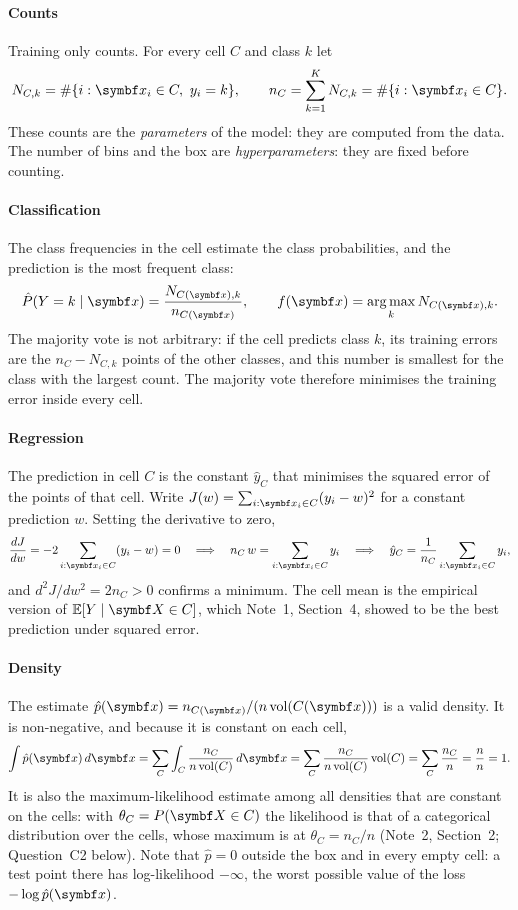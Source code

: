 \documentclass[11pt]{article}
\begin{document}
\paragraph{Counts} Training only counts. For every cell $C$ and class $k$ let
\[
  N_{C,k} = \#\{i : \x_i \in C,\ y_i = k\}, \qquad n_C = \sum_{k=1}^K N_{C,k} = \#\{i : \x_i \in C\} .
\]
These counts are the \emph{parameters} of the model: they are computed from the data. The number of bins and the
box are \emph{hyperparameters}: they are fixed before counting.

\paragraph{Classification} The class frequencies in the cell estimate the class probabilities, and the prediction
is the most frequent class:
\begin{equation}\label{eq:classprob}
  \hat P(Y = k \mid \x) = \frac{N_{C(\x),k}}{n_{C(\x)}}, \qquad f(\x) = \argmax_k N_{C(\x),k} .
\end{equation}
The majority vote is not arbitrary: if the cell predicts class $k$, its training errors are the $n_C - N_{C,k}$
points of the other classes, and this number is smallest for the class with the largest count. The majority vote
therefore minimises the training error inside every cell.

\paragraph{Regression} The prediction in cell $C$ is the constant $\hat y_C$ that minimises the squared error of the
points of that cell. Write $J(w) = \sum_{i : \x_i \in C} (y_i - w)^2$ for a constant prediction $w$. Setting the derivative to zero,
\[
  \frac{dJ}{dw} = -2 \sum_{i : \x_i \in C} (y_i - w) = 0
  \quad\Longrightarrow\quad n_C\, w = \sum_{i : \x_i \in C} y_i
  \quad\Longrightarrow\quad \hat y_C = \frac{1}{n_C} \sum_{i : \x_i \in C} y_i ,
\]
and $d^2J/dw^2 = 2 n_C > 0$ confirms a minimum. The cell mean is the empirical version of $\E[Y \mid \X \in C]$, which
Note~1, Section~4, showed to be the best prediction under squared error.

\paragraph{Density} The estimate $\hat p(\x) = n_{C(\x)} / (n\,\mathrm{vol}(C(\x)))$ is a valid density. It is
non-negative, and because it is constant on each cell,
\[
  \int \hat p(\x)\, d\x = \sum_C \int_C \frac{n_C}{n\,\mathrm{vol}(C)}\, d\x
  = \sum_C \frac{n_C}{n\,\mathrm{vol}(C)}\, \mathrm{vol}(C) = \sum_C \frac{n_C}{n} = \frac{n}{n} = 1 .
\]
It is also the maximum-likelihood estimate among all densities that are constant on the cells: with
$\theta_C = P(\X \in C)$ the likelihood is that of a categorical distribution over the cells, whose maximum is at
$\theta_C = n_C/n$ (Note~2, Section~2; Question~C2 below). Note that $\hat p = 0$ outside the box and in every empty cell: a test point there has log-likelihood
$-\infty$, the worst possible value of the loss $-\log \hat p(\x)$.
\end{document}
